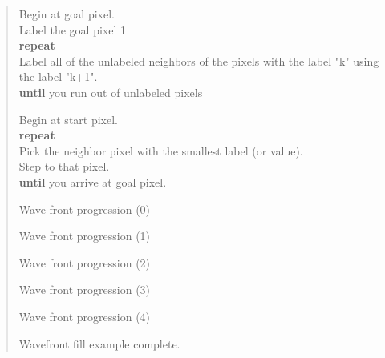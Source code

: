 \begin{quote}
Begin at goal pixel.\\
Label the goal pixel 1\\
\textbf{repeat}\\
\hspace*{0.333em}\hspace*{0.333em}\hspace*{0.333em}\hspace*{0.333em}Label
all of the unlabeled neighbors of the pixels with the label "k" using
the label "k+1".\\
\textbf{until} you run out of unlabeled pixels

Begin at start pixel.\\
\textbf{repeat}\\
\hspace*{0.333em}\hspace*{0.333em}\hspace*{0.333em}\hspace*{0.333em}Pick
the neighbor pixel with the smallest label (or value).\\
\hspace*{0.333em}\hspace*{0.333em}\hspace*{0.333em}\hspace*{0.333em}Step
to that pixel.\\
\textbf{until} you arrive at goal pixel.

Wave front progression (0)

Wave front progression (1)

Wave front progression (2)

Wave front progression (3)

Wave front progression (4)

Wavefront fill example complete.
\end{quote}

